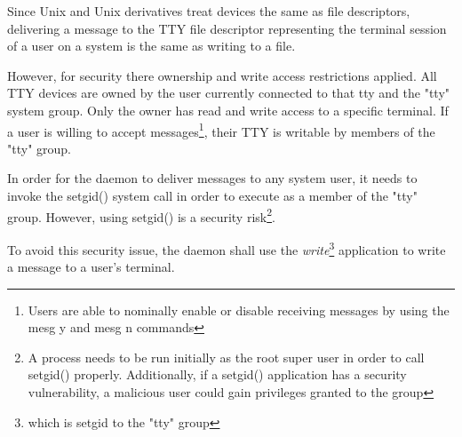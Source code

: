 
Since Unix and Unix derivatives treat devices the same as file
descriptors, delivering a message to the TTY file descriptor 
representing the terminal session of a user on a system is the 
same as writing to a file.


However, for security there ownership and write access restrictions
applied. All TTY devices are owned by the user currently connected to
that tty and the "tty" system group. Only the owner has read and write
access to a specific terminal. If a user is willing to accept 
messages\footnote{Users are able to nominally enable or disable receiving messages by using the mesg y and mesg n commands},
their TTY is writable by members of the "tty" group.


In order for the daemon to deliver messages to any system user, it needs
to invoke the setgid() system call in order to execute as a member of 
the "tty" group. However, using setgid() is a security 
risk\footnote{A process needs to be run initially as the root super user in order to call setgid() properly. Additionally, if a setgid() application has a security vulnerability, a malicious user could gain privileges granted to the group}.


To avoid this security issue, the daemon shall use the 
\emph{write}\footnote{which is setgid to the "tty" group} application
to write a message to a user's terminal.
